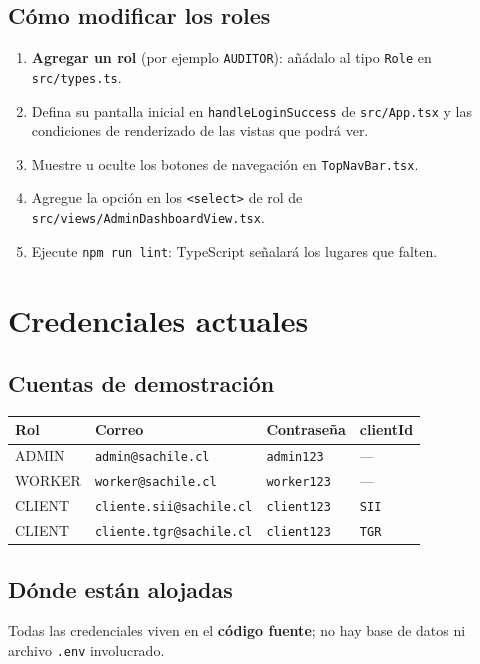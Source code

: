 \documentclass[11pt,a4paper]{article}
\newcommand{\ruta}[1]{\texttt{#1}}
\begin{document}
\subsection{Cómo modificar los roles}
\begin{enumerate}[leftmargin=*]
  \item \textbf{Agregar un rol} (por ejemplo \texttt{AUDITOR}): añádalo al tipo
        \texttt{Role} en \ruta{src/types.ts}.
  \item Defina su pantalla inicial en \texttt{handleLoginSuccess} de \ruta{src/App.tsx} y
        las condiciones de renderizado de las vistas que podrá ver.
  \item Muestre u oculte los botones de navegación en \ruta{TopNavBar.tsx}.
  \item Agregue la opción en los \texttt{<select>} de rol de
        \ruta{src/views/AdminDashboardView.tsx}.
  \item Ejecute \texttt{npm run lint}: TypeScript señalará los lugares que falten.
\end{enumerate}

\section{Credenciales actuales}\label{sec:credenciales}

\subsection{Cuentas de demostración}
\begin{center}
\begin{tabular}{llll}
\toprule
\textbf{Rol} & \textbf{Correo} & \textbf{Contraseña} & \textbf{clientId} \\
\midrule
ADMIN  & \texttt{admin@sachile.cl}       & \texttt{admin123}  & --- \\
WORKER & \texttt{worker@sachile.cl}      & \texttt{worker123} & --- \\
CLIENT & \texttt{cliente.sii@sachile.cl} & \texttt{client123} & \texttt{SII} \\
CLIENT & \texttt{cliente.tgr@sachile.cl} & \texttt{client123} & \texttt{TGR} \\
\bottomrule
\end{tabular}
\end{center}

\subsection{Dónde están alojadas}
Todas las credenciales viven en el \textbf{código fuente}; no hay base de datos ni archivo
\texttt{.env} involucrado.
\end{document}
